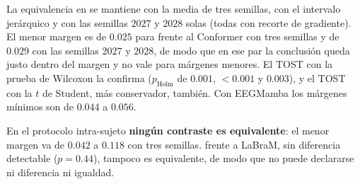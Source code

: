 La equivalencia en \loso{} se mantiene con la media de tres semillas, con el intervalo jerárquico y con las
semillas $2027$ y $2028$ solas (todas con recorte de gradiente). El menor margen es de $0.025$ para
\eegnet{} frente al Conformer con tres semillas y de $0.029$ con las semillas $2027$ y $2028$, de modo que
en ese par la conclusión queda justo dentro del margen y no vale para márgenes menores. El TOST con la
prueba de Wilcoxon la confirma ($p_{\text{Holm}}$ de $0.001$, $<0.001$ y $0.003$), y el TOST con la $t$ de
Student, más conservador, también. Con EEGMamba los márgenes mínimos son de $0.044$ a $0.056$.

En el protocolo intra-sujeto \textbf{ningún contraste es equivalente}: el menor margen va de $0.042$ a
$0.118$ con tres semillas. \eegnet{} frente a LaBraM, sin diferencia detectable ($p = 0.44$), tampoco es
equivalente, de modo que no puede declararse ni diferencia ni igualdad.

